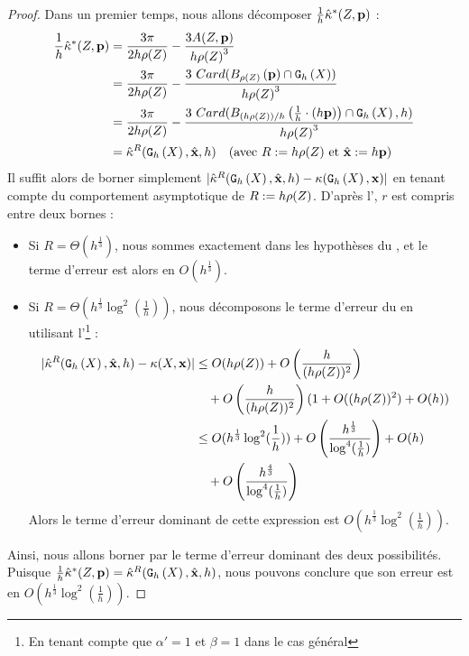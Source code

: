 \begin{proof}
  Dans un premier temps, nous allons décomposer
  $\frac{1}{h}\hat{\kappa}^{*}(Z,\mathbf{p})$ :
  \begin{align}
    \frac{1}{h}\hat{\kappa}^{*}(Z,\mathbf{p}) &= \frac{3\pi}{2 h\rho(Z)} - \frac{3 A(Z,\mathbf{p})}{h{\rho(Z)}^3} \\
    &= \frac{3\pi}{2 h\rho(Z)} - \frac{3~ Card(B_{\rho(Z)}\left(\mathbf{p}\right) \cap \mathtt{G}_{h}\left(X\right))}{h{\rho(Z)}^3} \\
    &= \frac{3\pi}{2 h\rho(Z)} - \frac{3~ Card( B_{(h\rho(Z))/h}\left(\frac{1}{h} \cdot (h\mathbf{p})\right) \cap \mathtt{G}_{h}\left(X\right), h)}{h{\rho(Z)}^3} \\
    &= \hat{\kappa}^{R}(\mathtt{G}_{h}\left(X\right),\hat{\mathbf{x}},h)\quad \text{(avec $R := h\rho(Z)$ et $\hat{\mathbf{x}} := h\mathbf{p}$)}
  \end{align}
  Il suffit alors de borner simplement $| \hat{\kappa}^{R}(\mathtt{G}_{h}\left(X\right),\hat{\mathbf{x}},h) -
  \kappa(\mathtt{G}_{h}\left(X\right),\mathbf{x}) |$ en tenant compte du comportement asymptotique de $R :=
  h\rho(Z)$. D'après l', $r$ est
  compris entre deux bornes :
  \begin{itemize}
    \item Si $R = \Theta(h^{\frac{1}{3}})$, nous sommes exactement dans les
    hypothèses du , et le terme d'erreur
    est alors en $O( h^\frac{1}{3} )$.
    \item Si $R = \Theta(h^{\frac{1}{3}} \log^2 \left(\frac{1}{h}\right))$, nous
    décomposons le terme d'erreur du  en
    utilisant l'\footnote{En
    tenant compte que $\alpha' = 1$ et $\beta = 1$ dans le cas général} :
    \begin{align}
      |\hat{\kappa}^{R}(\mathtt{G}_{h}\left(X\right),\hat{\mathbf{x}},h) - \kappa(X,\mathbf{x})| & \le O(h\rho(Z)) + O\left(\frac{h}{(h\rho(Z))^{2}}\right) \nonumber\\
      &\quad + O\left(\frac{h}{(h\rho(Z))^{2}}\right)( 1 + O((h\rho(Z))^2) + O(h)) \\
      & \le O(h^{\frac{1}{3}} \log^2 (\frac{1}{h})) + O\left(\frac{h^\frac{1}{3}}{\log^4 (\frac{1}{h})}\right) + O( h ) \nonumber\\
      &\quad + O\left(\frac{h^\frac{4}{3}}{\log^4 (\frac{1}{h})}\right)
    \end{align}
    Alors le terme d'erreur dominant de cette expression est $O(h^{\frac{1}{3}}
    \log^2 (\frac{1}{h}))$.
  \end{itemize}
  Ainsi, nous allons borner par le terme d'erreur dominant des deux
  possibilités. Puisque
  $\frac{1}{h}\hat{\kappa}^{*}(Z,\mathbf{p})=\hat{\kappa}^{R}(\mathtt{G}_{h}\left(X\right),\hat{\mathbf{x}},h)$, nous pouvons
  conclure que son erreur est en $O(h^{\frac{1}{3}} \log^2 (\frac{1}{h}))$.
\end{proof}


